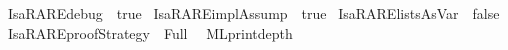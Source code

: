 \begin{isabellebody}
\isamarkupfalse%
{\isacharbrackleft}{\kern0pt}{\isacharbrackleft}{\kern0pt}IsaRARE{\isacharunderscore}{\kern0pt}debug\ {\isacharequal}{\kern0pt}\ true{\isacharbrackright}{\kern0pt}{\isacharbrackright}{\kern0pt}\ \isanewline
{}\isamarkupfalse%
{\isacharbrackleft}{\kern0pt}{\isacharbrackleft}{\kern0pt}IsaRARE{\isacharunderscore}{\kern0pt}implAssump\ {\isacharequal}{\kern0pt}\ true{\isacharbrackright}{\kern0pt}{\isacharbrackright}{\kern0pt}\ \isanewline
{}\isamarkupfalse%
{\isacharbrackleft}{\kern0pt}{\isacharbrackleft}{\kern0pt}IsaRARE{\isacharunderscore}{\kern0pt}listsAsVar\ {\isacharequal}{\kern0pt}\ false{\isacharbrackright}{\kern0pt}{\isacharbrackright}{\kern0pt}\ \isanewline
{}\isamarkupfalse%
{\isacharbrackleft}{\kern0pt}{\isacharbrackleft}{\kern0pt}IsaRARE{\isacharunderscore}{\kern0pt}proofStrategy\ {\isacharequal}{\kern0pt}\ {\isachardoublequoteopen}Full{\isachardoublequoteclose}{\isacharbrackright}{\kern0pt}{\isacharbrackright}{\kern0pt}\ \isanewline
{}\isamarkupfalse%
\ {\isacharbrackleft}{\kern0pt}{\isacharbrackleft}{\kern0pt}ML{\isacharunderscore}{\kern0pt}print{\isacharunderscore}{\kern0pt}depth{\isacharequal}{\kern0pt}{}{}{}{}{}{\isacharbrackright}{\kern0pt}{\isacharbrackright}{\kern0pt}%
\isadelimdocument
%
\endisadelimdocument
%
\isatagdocument
%
\isamarkuptrue%
%
\isamarkuptrue%
%
\endisatagdocument
{\isafolddocument}%
%
\isadelimdocument
%
\endisadelimdocument
%
\isadelimtheory
%
\endisadelimtheory
%
\isatagtheory
{}\isamarkupfalse%
%
\endisatagtheory
{\isafoldtheory}%
%
\isadelimtheory
%
\endisadelimtheory
%
\end{isabellebody}%
\endinput
